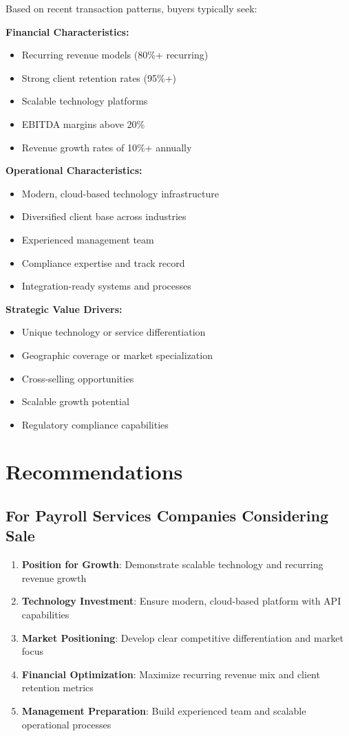 \documentclass[12pt,a4paper]{article}
\begin{document}
Based on recent transaction patterns, buyers typically seek:

\textbf{Financial Characteristics:}
\begin{itemize}
    \item Recurring revenue models (80\%+ recurring)
    \item Strong client retention rates (95\%+)
    \item Scalable technology platforms
    \item EBITDA margins above 20\%
    \item Revenue growth rates of 10\%+ annually
\end{itemize}

\textbf{Operational Characteristics:}
\begin{itemize}
    \item Modern, cloud-based technology infrastructure
    \item Diversified client base across industries
    \item Experienced management team
    \item Compliance expertise and track record
    \item Integration-ready systems and processes
\end{itemize}

\textbf{Strategic Value Drivers:}
\begin{itemize}
    \item Unique technology or service differentiation
    \item Geographic coverage or market specialization
    \item Cross-selling opportunities
    \item Scalable growth potential
    \item Regulatory compliance capabilities
\end{itemize}

\section{Recommendations}

\subsection{For Payroll Services Companies Considering Sale}

\begin{enumerate}
    \item \textbf{Position for Growth}: Demonstrate scalable technology and recurring revenue growth
    \item \textbf{Technology Investment}: Ensure modern, cloud-based platform with API capabilities
    \item \textbf{Market Positioning}: Develop clear competitive differentiation and market focus
    \item \textbf{Financial Optimization}: Maximize recurring revenue mix and client retention metrics
    \item \textbf{Management Preparation}: Build experienced team and scalable operational processes
\end{enumerate}
\end{document}
